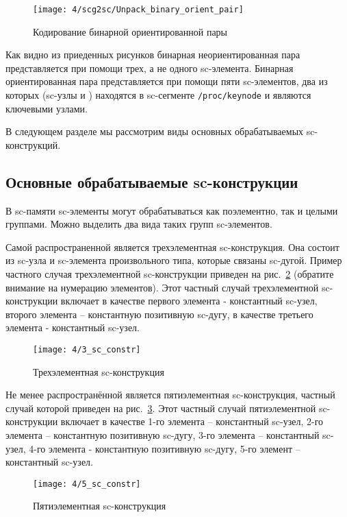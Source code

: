 \begin{figure}[h!]
  \centering
  \texttt{[image: 4/scg2sc/Unpack\_binary\_orient\_pair]}
  \caption{Кодирование бинарной ориентированной пары}
  \label{fig:Unpack_binary_orient_pair}
\end{figure}

Как видно из приеденных рисунков бинарная неориентированная пара
представляется при помощи трех, а не одного sc-элемента. Бинарная
ориентированная пара представляется при помощи пяти sc-элементов, два
из которых (sc-узлы  и ) находятся в sc-сегменте
\verb|/proc/keynode| и являются ключевыми узлами.

В следующем разделе мы рассмотрим виды основных обрабатываемых
sc-конструкций.

\subsection{Основные обрабатываемые sc-конструкции}

В sc-памяти sc-элементы могут обрабатываться как поэлементно, так и
целыми группами. Можно выделить два вида таких групп sc-элементов.

Самой распространенной является трехэлементная sc-конструкция. Она
состоит из sc-узла и sc-элемента произвольного типа, которые связаны
sc-дугой. Пример частного случая трехэлементной sc-конструкции
приведен на рис.~\ref{fig:3_sc_constr} (обратите внимание на нумерацию
элементов). Этот частный случай трехэлементной sc-конструкции включает
в качестве первого элемента - константный sc-узел, второго элемента –
константную позитивную sc-дугу, в качестве третьего элемента -
константный sc-узел.

\begin{figure}[h!]
  \centering
  \texttt{[image: 4/3\_sc\_constr]}
  \caption{Трехэлементная sc-конструкция}
  \label{fig:3_sc_constr}
\end{figure}

Не менее распространённой является пятиэлементная sc-конструкция,
частный случай которой приведен на рис.~\ref{fig:5_sc_constr}. Этот
частный случай пятиэлементной sc-конструкции включает в качестве 1-го
элемента – константный sc-узел, 2-го элемента – константную позитивную
sc-дугу, 3-го элемента – константный sc-узел, 4-го элемента -
константную позитивную sc-дугу, 5-го элемент – константный sc-узел.

\begin{figure}[h!]
  \centering
  \texttt{[image: 4/5\_sc\_constr]}
  \caption{Пятиэлементная sc-конструкция}
  \label{fig:5_sc_constr}
\end{figure}

